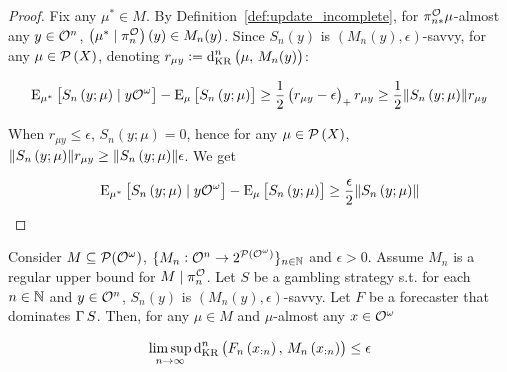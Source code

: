 \begin{proof}

Fix any $\mu^* \in M$. By Definition~\ref{def:update_incomplete}, for $\pi^{\mathcal{O}}_{n*}\mu$-almost any $y\in\mathcal{O}^n$, ${\left(\mu^* \mid \pi^{\mathcal{O}}_n\right)\left(y\right) \in M_n(y)}$. Since $S_n\left(y\right)$ is $\left(M_n(y),\epsilon\right)$-savvy, for any $\mu \in \mathcal{P}\left(X\right)$, denoting $r_{\mu y}:=\operatorname{d}_{\textnormal{KR}}^n\left(\mu,\,M_n(y)\right)$:

$$\operatorname{E}_{\mu^*}\left[S_n\left(y;\mu\right) \mid y\mathcal{O}^\omega\right] - \operatorname{E}_{\mu}\left[S_n\left(y;\mu\right)\right] \geq \frac{1}{2} \left(r_{\mu y} - \epsilon\right)_+ r_{\mu y} \geq \frac{1}{2} \lVert S_n\left(y;\mu\right) \rVert r_{\mu y}$$

When $r_{\mu y} \leq \epsilon$, $S_n\left(y;\mu\right) = 0$, hence for any $\mu \in \mathcal{P}\left(X\right)$, $\lVert S_n\left(y;\mu\right) \rVert r_{\mu y} \geq \lVert S_n\left(y;\mu\right) \rVert \epsilon$. We get

$$\operatorname{E}_{\mu^*}\left[S_n\left(y;\mu\right) \mid y\mathcal{O}^\omega\right] - \operatorname{E}_{\mu}\left[S_n\left(y;\mu\right)\right] \geq \frac{\epsilon}{2} \lVert S_n\left(y;\mu\right) \rVert$$
\end{proof}

\begin{samepage}
\begin{corollary}
\label{crl:vicinity_convergence}

Consider $M \subseteq \mathcal{P}(\mathcal{O}^\omega)$, $\{M_n : \mathcal{O}^n \rightarrow 2^{\mathcal{P}(\mathcal{O}^\omega)}\}_{n \in \mathbb{N}}$ and $\epsilon > 0$. Assume $M_n$ is a regular upper bound for $M \mid \pi^{\mathcal{O}}_n$. Let $S$ be a gambling strategy s.t. for each $n \in \mathbb{N}$ and $y \in \mathcal{O}^n$, $S_n\left(y\right)$ is $\left(M_n(y),\epsilon\right)$-savvy. Let $F$ be a forecaster that dominates $\operatorname{\Gamma}{S}$. Then, for any $\mu \in M$ and $\mu$-almost any $x \in \mathcal{O}^\omega$

\begin{equation}
\limsup_{n \rightarrow \infty} \operatorname{d}_{\textnormal{KR}}^n\left(F_n\left(x_{:n}\right),\, M_n\left(x_{:n}\right)\right) \leq \epsilon
\end{equation}

\end{corollary}
\end{samepage}

